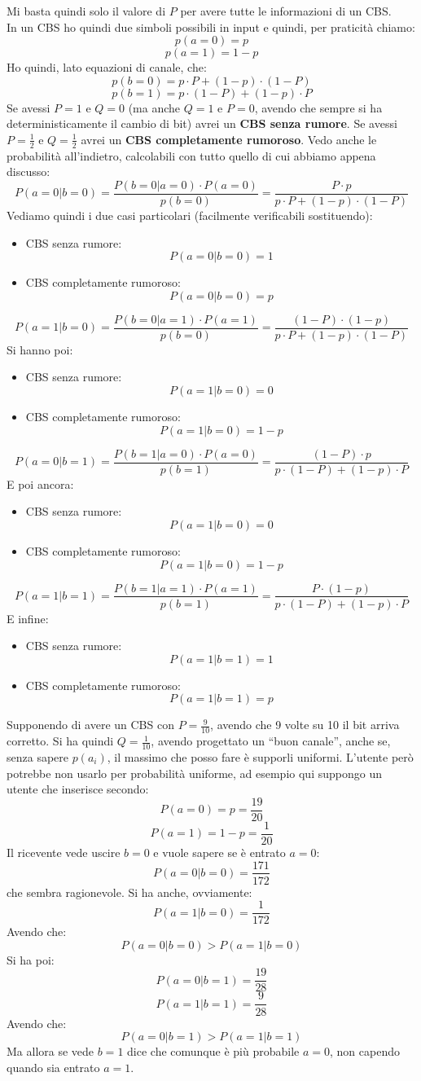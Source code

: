 \documentclass[a4paper,12pt, oneside]{book}
\begin{document}
Mi basta quindi solo il valore di $P$ per avere tutte le informazioni di un
CBS. \\
In un CBS ho quindi due simboli possibili in input e quindi, per praticità
chiamo: 
\[p(a=0)=p\]
\[p(a=1)=1-p\]
Ho quindi, lato equazioni di canale, che:
\[p(b=0)=p\cdot P+(1-p)\cdot (1-P)\]
\[p(b=1)=p\cdot (1-P)+ (1-p)\cdot P\]
Se avessi $P=1$ e $Q=0$ (ma anche $Q=1$ e $P=0$, avendo che sempre si ha
deterministicamente il cambio di bit) avrei un \textbf{CBS senza
  rumore}. Se avessi $P=\frac{1}{2}$ e $Q=\frac{1}{2}$ avrei un \textbf{CBS
  completamente rumoroso}.
Vedo anche le probabilità all'indietro, calcolabili con tutto quello di cui
abbiamo appena discusso:
\[P(a=0|b=0)=\frac{P(b=0|a=0)\cdot P(a=0)}{p(b=0)}=\frac{P\cdot p}{p\cdot
    P+(1-p)\cdot (1-P)}\]
Vediamo quindi i due casi particolari (facilmente verificabili sostituendo):
\begin{itemize}
  \item CBS senza rumore:
  \[P(a=0|b=0)=1\]
  \item CBS completamente rumoroso:
  \[P(a=0|b=0)=p\]
\end{itemize}
\[P(a=1|b=0)=\frac{P(b=0|a=1)\cdot P(a=1)}{p(b=0)}=\frac{(1-P)\cdot
    (1-p)}{p\cdot P+(1-p)\cdot (1-P)}\]
Si hanno poi:
\begin{itemize}
  \item CBS senza rumore:
  \[P(a=1|b=0)=0\]
  \item CBS completamente rumoroso:
  \[P(a=1|b=0)=1-p\]
\end{itemize}
\[P(a=0|b=1)=\frac{P(b=1|a=0)\cdot P(a=0)}{p(b=1)}=\frac{(1-P)\cdot p}{p\cdot
    (1-P)+ (1-p)\cdot P}\]  
E poi ancora:
\begin{itemize}
  \item CBS senza rumore:
  \[P(a=1|b=0)=0\]
  \item CBS completamente rumoroso:
  \[P(a=1|b=0)=1-p\]
\end{itemize}
\[P(a=1|b=1)=\frac{P(b=1|a=1)\cdot P(a=1)}{p(b=1)}=\frac{P\cdot
    (1-p)}{p\cdot (1-P)+ (1-p)\cdot P}\]
E infine:
\begin{itemize}
  \item CBS senza rumore:
  \[P(a=1|b=1)=1\]
  \item CBS completamente rumoroso:
  \[P(a=1|b=1)=p\]
\end{itemize}
\begin{esempio}
  Supponendo di avere un CBS con $P=\frac{9}{10}$, avendo che 9 volte su 10 il
  bit 
  arriva corretto. Si ha quindi $Q=\frac{1}{10}$, avendo progettato un ``buon
  canale'', anche se, senza sapere $p(a_i)$, il massimo che posso fare è
  supporli 
  uniformi. L'utente però potrebbe non usarlo per probabilità uniforme, ad
  esempio 
  qui suppongo un utente che inserisce secondo:
  \[P(a=0)=p=\frac{19}{20}\]
  \[P(a=1)=1-p=\frac{1}{20}\]
  Il ricevente vede uscire $b=0$ e vuole sapere se è entrato $a=0$:
  \[P(a=0|b=0)=\frac{171}{172}\]
  che sembra ragionevole. Si ha anche, ovviamente:
  \[P(a=1|b=0)=\frac{1}{172}\]
  Avendo che:
  \[P(a=0|b=0)>P(a=1|b=0)\]
  Si ha poi:
  \[P(a=0|b=1)=\frac{19}{28}\]
  \[P(a=1|b=1)=\frac{9}{28}\]
  Avendo che:
  \[P(a=0|b=1)>P(a=1|b=1)\]
  Ma allora se vede $b=1$ dice che comunque è più probabile $a=0$, non capendo
  quando sia entrato $a=1$.
\end{esempio}
\end{document}
